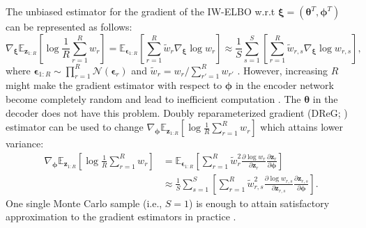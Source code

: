 \documentclass[a4paper,12pt]{article}
\theoremstyle{plain} %
\theoremstyle{remark} %
\theoremstyle{definition} %
\begin{document}
The unbiased estimator for the gradient of the IW-ELBO w.r.t $\bm{\xi}=(\bm{\theta}^T,\bm{\phi}^T)$ can be represented as follows:
\begin{equation}\label{eq:grad_iwvi}
    \nabla_{\bm{\xi}}\mathbb{E}_{\bm{z}_{1:R}}\left[ \log \frac{1}{R}\sum\limits_{r=1}^R w_r\right] = \mathbb{E}_{\bm{\epsilon}_{1:R}}\left[ \sum\limits_{r=1}^R \tilde{w}_r \nabla_{\bm{\xi}} \log w_r\right]\approx \frac{1}{S}\sum\limits_{s=1}^S\left[ \sum\limits_{r=1}^R \tilde{w}_{r,s} \nabla_{\bm{\xi}} \log w_{r,s}\right],
\end{equation}
where $\bm{\epsilon}_{1:R}\sim\prod_{r=1}^R\mathcal{N}(\bm{\epsilon}_r)$ and $\tilde{w}_r = w_r / \sum_{r'=1}^R w_{r'}$ \citep{urban2021deep}. However, increasing $R$ might make the gradient estimator with respect to $\bm{\phi}$ in the encoder network become completely random and lead to inefficient computation \citep{rainforth2018tighter}. The $\bm{\theta}$ in the decoder does not have this problem. Doubly reparameterized gradient (DReG; \citealp{tucker2018doubly,urban2021deep}) estimator can be used to change $\nabla_{\bm{\phi}}\mathbb{E}_{\bm{z}_{1:R}}\left[ \log \frac{1}{R}\sum_{r=1}^R w_r\right]$ which attains lower variance:
\begin{equation}\label{eq:dreg}
    \begin{aligned}
        \nabla_{\bm{\phi}}\mathbb{E}_{\bm{z}_{1:R}}\left[ \log \frac{1}{R}\sum\limits_{r=1}^R w_r\right] &= \mathbb{E}_{\bm{\epsilon}_{1:R}}\left[ \sum\limits_{r=1}^R \tilde{w}_r^2 \frac{\partial \log w_r}{\partial \bm{z}_r}\frac{\partial\bm{z}_r}{\partial\bm{\phi}}\right]\\
        &\approx \frac{1}{S}\sum\limits_{s=1}^S\left[ \sum\limits_{r=1}^R \tilde{w}_{r,s}^2 \frac{\partial \log w_{r,s}}{\partial \bm{z}_{r,s}}\frac{\partial\bm{z}_{r,s}}{\partial\bm{\phi}}\right].
    \end{aligned}
\end{equation}
One single Monte Carlo sample (i.e., $S=1$) is enough to attain satisfactory approximation to the gradient estimators in practice \citep{burda2015importance,tucker2018doubly,urban2021deep}.
\end{document}
